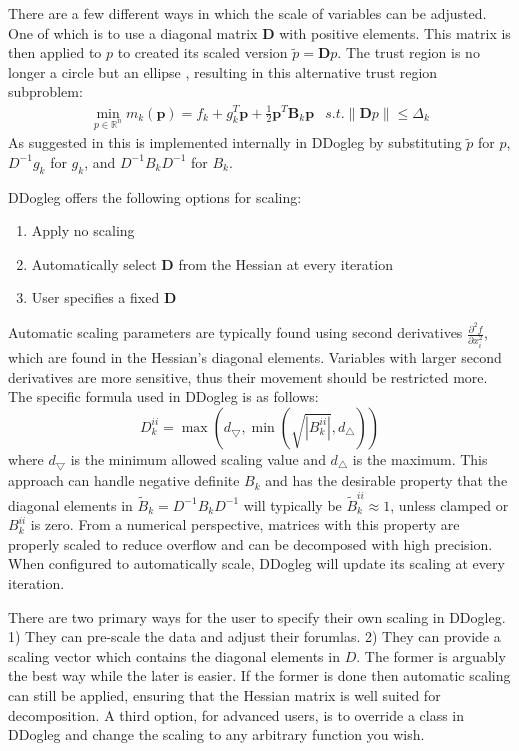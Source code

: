 \documentclass[peerreview,compsoc,onecolumn]{IEEEtran}
\newcommand{\R}{\mathbb{R}}
\newcommand{\norm}[1]{\left\lVert#1\right\rVert}
\newenvironment{enumargin}[1]{\begin{enumerate}[leftmargin=#1\textwidth , rightmargin=#1\textwidth]}{\end{enumerate}}
\begin{document}
There are a few different ways in which the scale of variables can be adjusted. One of which is to use a diagonal matrix $\bm{D}$ with positive elements. This matrix is then applied to $p$ to created its scaled version $\tilde{p} = \bm{D}p$. The trust region is no longer a circle but an ellipse \cite{numopt2006}, resulting in this alternative trust region subproblem:
\begin{equation}
\begin{array}{lr}
\min\limits_{p\in \R^n} m_k(\bm{p}) = f_k + g^T_k \bm{p} + \frac{1}{2}\bm{p}^T \bm{B}_k \bm{p} & s.t. \norm{\bm{D}p} \le \Delta_k
\end{array}
\end{equation}
As suggested in \cite{numopt2006} this is implemented internally in DDogleg by substituting $\tilde{p}$ for $p$, $D^{-1}g_k$ for $g_k$, and $D^{-1}B_k D^{-1}$ for $B_k$.  

DDogleg offers the following options for scaling:
\begin{enumargin}{0.2}
\item Apply no scaling
\item Automatically select $\bm{D}$ from the Hessian at every iteration
\item User specifies a fixed $\bm{D}$ 
\end{enumargin}
Automatic scaling parameters are typically found using second derivatives $\frac{\partial^2 f}{\partial x^2_i}$, which are found in the Hessian's diagonal elements. Variables with larger second derivatives are more sensitive, thus their movement should be restricted more. The specific formula used in DDogleg is as follows:
\begin{equation}
D_k^{ii} = \max\left( d_{\bigtriangledown},\min\left( \sqrt{|B_k^{ii}|} , d_{\bigtriangleup} \right)\right)
\end{equation}
where $d_{\bigtriangledown}$ is the minimum allowed scaling value and $d_{\bigtriangleup}$ is the maximum. This approach can handle negative definite $B_k$ and has the desirable property \cite{dennis1996} that the diagonal elements in $\tilde{B}_k = D^{-1}B_k D^{-1}$ will typically be $\tilde{B}_k^{ii} \approx 1$, unless clamped or $B_k^{ii}$ is zero. From a numerical perspective, matrices with this property are properly scaled to reduce overflow and can be decomposed with high precision. When configured to automatically scale, DDogleg will update its scaling at every iteration.

There are two primary ways for the user to specify their own scaling in DDogleg. 1) They can pre-scale the data and adjust their forumlas. 2) They can provide a scaling vector which contains the diagonal elements in $D$. The former is arguably the best way while the later is easier. If the former is done then automatic scaling can still be applied, ensuring that the Hessian matrix is well suited for decomposition. A third option, for advanced users, is to override a class in DDogleg and change the scaling to any arbitrary function you wish.
\end{document}
